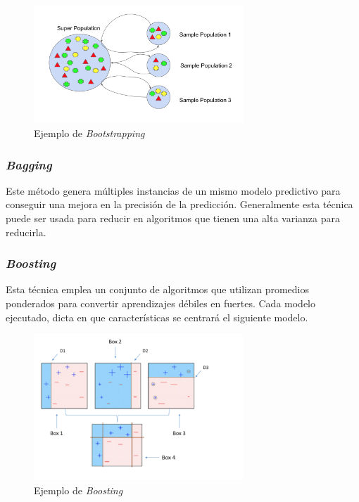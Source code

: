 \begin{figure}[h]
    \centering
    \includegraphics[width=0.7\textwidth, keepaspectratio]{imaxes/Bootstrapping.png}
    \caption[Ejemplo de \textit{Bootstrapping}]{Ejemplo de \textit{Bootstrapping}~\cite{Bootstrapping}}
    \label{fig:bootstrapping}
\end{figure}


\subsubsection{\textit{Bagging}~\cite{breiman1996bagging}}

Este método genera  múltiples instancias de un mismo modelo predictivo para conseguir una mejora en la precisión de la predicción. Generalmente esta técnica puede ser usada para reducir en algoritmos que tienen una alta varianza para reducirla.


\subsubsection{\textit{Boosting}}
Esta técnica emplea un conjunto de algoritmos que utilizan promedios ponderados para convertir aprendizajes débiles en fuertes. Cada modelo ejecutado, dicta en que características se centrará el siguiente modelo.

\begin{figure}[h]
    \centering
    \includegraphics[width=0.7\textwidth, keepaspectratio]{imaxes/boosting.png}
    \caption[Ejemplo de \textit{Boosting}]{Ejemplo de \textit{Boosting}~\cite{bossting}}
    \label{fig:bossting}
\end{figure}

